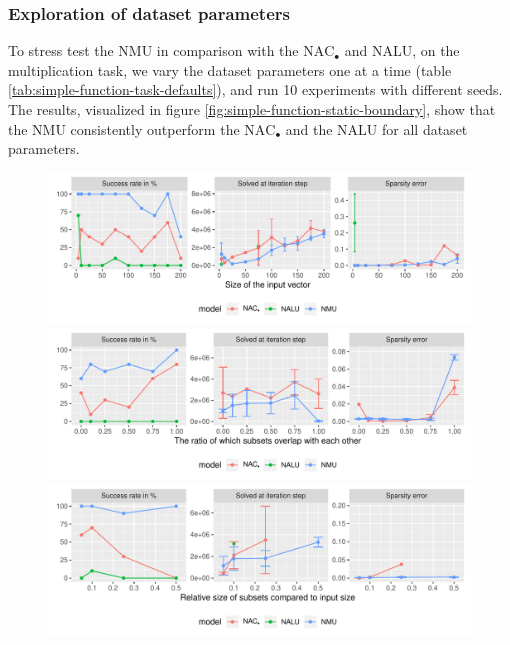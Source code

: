 

\subsubsection{Exploration of dataset parameters}
To stress test the NMU in comparison with the  $\mathrm{NAC}_{\bullet}$ and NALU, on the multiplication task, we vary the dataset parameters one at a time (table \ref{tab:simple-function-task-defaults}), and run 10 experiments with different seeds. The results, visualized in figure \ref{fig:simple-function-static-boundary}, show that the NMU consistently outperform the $\mathrm{NAC}_{\bullet}$ and the NALU for all dataset parameters.

\begin{figure}[h]
\centering
\includegraphics[width=\linewidth,trim={0 1.3cm 0 0},clip]{results/simple_function_static_input_size.pdf}
\includegraphics[width=\linewidth,trim={0 1.3cm 0 0.809cm},clip]{results/simple_function_static_overlap.pdf}
\includegraphics[width=\linewidth,trim={0 1.3cm 0 0.809cm},clip]{results/simple_function_static_subset.pdf}

\end{figure}
